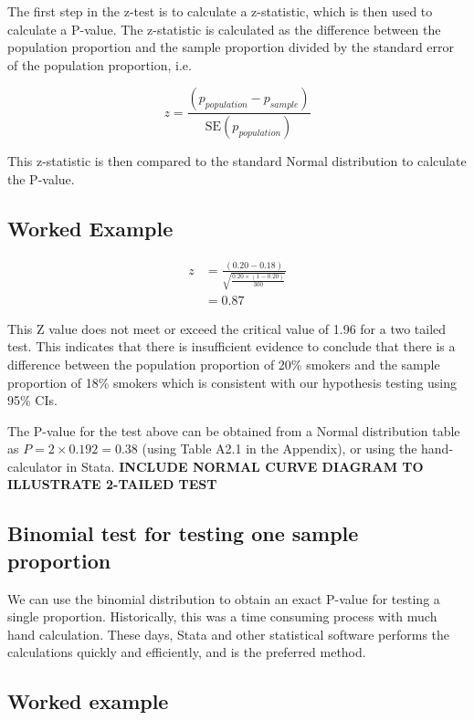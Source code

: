 \documentclass[
]{memoir}
\begin{document}
The first step in the z-test is to calculate a z-statistic, which is then used to calculate a P-value. The z-statistic is calculated as the difference between the population proportion and the sample proportion divided by the standard error of the population proportion, i.e.

\[
z = \frac{(p_{population} - p_{sample})}{\text{SE}(p_{population})}
\]

This z-statistic is then compared to the standard Normal distribution to calculate the P-value.

\hypertarget{worked-example-7}{%
\subsection{Worked Example}\label{worked-example-7}}

\[
\begin{aligned}
z &= \frac{(0.20 - 0.18)}{\sqrt{\frac{0.20 × (1 - 0.20)}{300}}} \\
 &= 0.87
\end{aligned}
\]

This Z value does not meet or exceed the critical value of 1.96 for a two tailed test. This indicates that there is insufficient evidence to conclude that there is a difference between the population proportion of 20\% smokers and the sample proportion of 18\% smokers which is consistent with our hypothesis testing using 95\% CIs.

The P-value for the test above can be obtained from a Normal distribution table as \(P = 2 × 0.192 = 0.38\) (using Table A2.1 in the Appendix), or using the hand-calculator in Stata. \textbf{INCLUDE NORMAL CURVE DIAGRAM TO ILLUSTRATE 2-TAILED TEST}

\hypertarget{binomial-test-for-testing-one-sample-proportion}{%
\subsection{Binomial test for testing one sample proportion}\label{binomial-test-for-testing-one-sample-proportion}}

We can use the binomial distribution to obtain an exact P-value for testing a single proportion. Historically, this was a time consuming process with much hand calculation. These days, Stata and other statistical software performs the calculations quickly and efficiently, and is the preferred method.

\hypertarget{worked-example-8}{%
\subsection{Worked example}\label{worked-example-8}}
\end{document}
